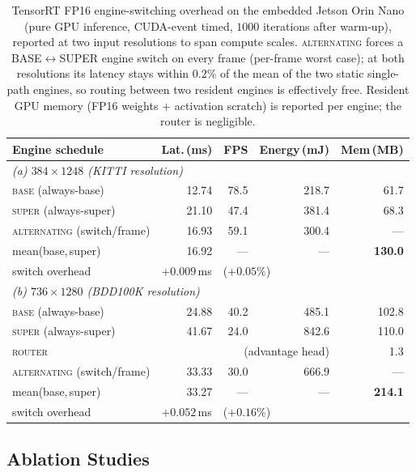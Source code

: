 \begin{table}[!t]
\caption{
    TensorRT FP16 engine-switching overhead on the embedded Jetson Orin Nano (pure GPU inference, CUDA-event timed, $1000$ iterations after warm-up), reported at two input resolutions to span compute scales. \textsc{alternating} forces a BASE$\leftrightarrow$SUPER engine switch on every frame (per-frame worst case); at both resolutions its latency stays within $0.2\%$ of the mean of the two static single-path engines, so routing between two resident engines is effectively free. Resident GPU memory (FP16 weights $+$ activation scratch) is reported per engine; the router is negligible.
}
\label{tab:trt}
\small
\setlength{\tabcolsep}{5pt}
\centering
\begin{tabular}{lrrrr}
\toprule
Engine schedule & Lat.\,(ms) & FPS & Energy\,(mJ) & Mem\,(MB)\\
\midrule
\multicolumn{5}{l}{\emph{(a) $384\times1248$ (KITTI resolution)}}\\
\textsc{base} (always-base) & 12.74 & 78.5 & 218.7 & 61.7\\
\textsc{super} (always-super) & 21.10 & 47.4 & 381.4 & 68.3\\
\textsc{alternating} (switch/frame) & 16.93 & 59.1 & 300.4 & ---\\
mean(base,\,super) & 16.92 & --- & --- & \textbf{130.0}\\
switch overhead & \multicolumn{4}{l}{$+0.009$\,ms\ \ ($+0.05\%$)}\\
\midrule
\multicolumn{5}{l}{\emph{(b) $736\times1280$ (BDD100K resolution)}}\\
\textsc{base} (always-base) & 24.88 & 40.2 & 485.1 & 102.8\\
\textsc{super} (always-super) & 41.67 & 24.0 & 842.6 & 110.0\\
\textsc{router} & \multicolumn{3}{r}{(advantage head)} & 1.3\\
\textsc{alternating} (switch/frame) & 33.33 & 30.0 & 666.9 & ---\\
mean(base,\,super) & 33.27 & --- & --- & \textbf{214.1}\\
switch overhead & \multicolumn{4}{l}{$+0.052$\,ms\ \ ($+0.16\%$)}\\
\bottomrule
\end{tabular}
\end{table}


\subsection{Ablation Studies}
\label{sec:ablation}
 

